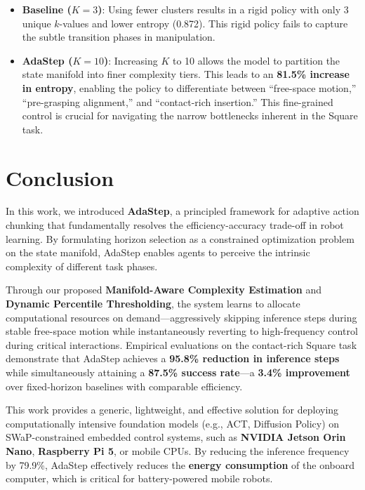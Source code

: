 \documentclass[conference]{IEEEtran}
\begin{document}
\begin{itemize}
    \item \textbf{Baseline ($K=3$)}: Using fewer clusters results in a rigid policy with only 3 unique $k$-values and lower entropy (0.872). This rigid policy fails to capture the subtle transition phases in manipulation.
    \item \textbf{AdaStep ($K=10$)}: Increasing $K$ to 10 allows the model to partition the state manifold into finer complexity tiers. This leads to an \textbf{81.5\% increase in entropy}, enabling the policy to differentiate between ``free-space motion,'' ``pre-grasping alignment,'' and ``contact-rich insertion.'' This fine-grained control is crucial for navigating the narrow bottlenecks inherent in the Square task.
\end{itemize}

\section{Conclusion}

In this work, we introduced \textbf{AdaStep}, a principled framework for adaptive action chunking that fundamentally resolves the efficiency-accuracy trade-off in robot learning. By formulating horizon selection as a constrained optimization problem on the state manifold, AdaStep enables agents to perceive the intrinsic complexity of different task phases.

Through our proposed \textbf{Manifold-Aware Complexity Estimation} and \textbf{Dynamic Percentile Thresholding}, the system learns to allocate computational resources on demand---aggressively skipping inference steps during stable free-space motion while instantaneously reverting to high-frequency control during critical interactions. Empirical evaluations on the contact-rich Square task demonstrate that AdaStep achieves a \textbf{95.8\% reduction in inference steps} while simultaneously attaining a \textbf{87.5\% success rate}---a \textbf{3.4\% improvement} over fixed-horizon baselines with comparable efficiency.

This work provides a generic, lightweight, and effective solution for deploying computationally intensive foundation models (e.g., ACT, Diffusion Policy) on SWaP-constrained embedded control systems, such as \textbf{NVIDIA Jetson Orin Nano}, \textbf{Raspberry Pi 5}, or mobile CPUs. By reducing the inference frequency by 79.9\%, AdaStep effectively reduces the \textbf{energy consumption} of the onboard computer, which is critical for battery-powered mobile robots.
\end{document}
